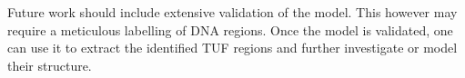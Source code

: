 \documentclass[12pt]{article}
\let\tempone\itemize
\let\temptwo\enditemize
\let\tempthree\enumerate
\let\tempfour\endenumerate
\renewenvironment{itemize}{\tempone\setlength{\itemsep}{0pt}}{\temptwo}
\renewenvironment{enumerate}{\tempthree\setlength{\itemsep}{0pt}}{\tempfour}
\begin{document}
Future work should include extensive validation of the model. This however may require a meticulous labelling of DNA regions. Once the model is validated, one  can use it to extract the identified TUF regions and further investigate or model their structure. 


\clearpage







%
%





\end{document}
